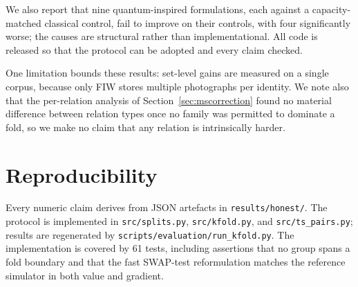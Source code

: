 \documentclass[preprint,12pt]{elsarticle}
\begin{document}
We also report that nine quantum-inspired formulations, each against a
capacity-matched classical control, fail to improve on their controls, with
four significantly worse; the causes are structural rather than
implementational. All code is released so that the protocol can be adopted and
every claim checked.

One limitation bounds these results: set-level gains are measured on a single
corpus, because only FIW stores multiple photographs per identity. We note also
that the per-relation analysis of Section~\ref{sec:mscorrection} found no
material difference between relation types once no family was permitted to
dominate a fold, so we make no claim that any relation is intrinsically
harder.

\section*{Reproducibility}

Every numeric claim derives from JSON artefacts in \texttt{results/honest/}.
The protocol is implemented in \texttt{src/splits.py}, \texttt{src/kfold.py},
and \texttt{src/ts\_pairs.py}; results are regenerated by
\texttt{scripts/evaluation/run\_kfold.py}. The implementation is covered by 61
tests, including assertions that no group spans a fold boundary and that the
fast SWAP-test reformulation matches the reference simulator in both value and
gradient.
\end{document}
